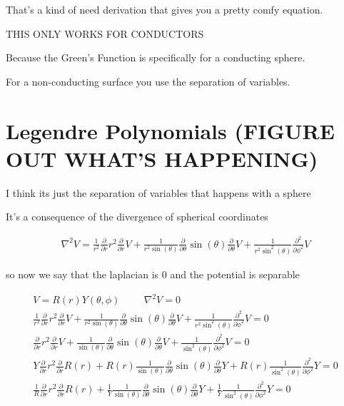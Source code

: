 \documentclass[fleqn]{report}
\newcommand{\hp}{\hspace{1cm}}
\newcommand{\del}{\partial}
\newcommand{\equations} [1] {
\begin{gather*}
#1
\end{gather*}
}
\begin{document}
That's a kind of need derivation that gives you a pretty comfy equation. 

THIS ONLY WORKS FOR CONDUCTORS

Because the Green's Function is specifically for a conducting sphere.

For a non-conducting surface you use the separation of variables. 


\section{Legendre Polynomials (FIGURE OUT WHAT'S HAPPENING)}
I think its just the separation of variables that happens with a sphere 

It's a consequence of the divergence of spherical coordinates 
\equations{
    \nabla^2 V
    =
    \frac{1}{r^2}
    \frac{\del}{\del r} 
    r^2 
    \frac{\del}{\del r}
    V
    +
    \frac{1}{r^2 \sin(\theta)}
    \frac{\del}{\del \theta} 
    \sin(\theta) 
    \frac{\del}{\del \theta} 
    V
    +
    \frac{1}{r^2 \sin^2(\theta)}
    \frac{\del^2}{\del \phi^2} V 
}

so now we say that the laplacian is 0 and the potential is separable 

\equations{
    V = R(r) Y(\theta, \phi)
    \hp
    \nabla^2 V = 0
    \\
    \frac{1}{r^2}
    \frac{\del}{\del r} 
    r^2 
    \frac{\del}{\del r}
    V
    +
    \frac{1}{r^2 \sin(\theta)}
    \frac{\del}{\del \theta} 
    \sin(\theta) 
    \frac{\del}{\del \theta} 
    V
    +
    \frac{1}{r^2 \sin^2(\theta)}
    \frac{\del^2}{\del \phi^2} V 
    =0
    \\
    \frac{\del}{\del r} 
    r^2 
    \frac{\del}{\del r}
    V
    +
    \frac{1}{\sin(\theta)}
    \frac{\del}{\del \theta} 
    \sin(\theta) 
    \frac{\del}{\del \theta} 
    V
    +
    \frac{1}{\sin^2(\theta)}
    \frac{\del^2}{\del \phi^2} V 
    =0
    \\
    Y
    \frac{\del}{\del r} 
    r^2 
    \frac{\del}{\del r}
    R(r) 
    +
    R(r)
    \frac{1}{\sin(\theta)}
    \frac{\del}{\del \theta} 
    \sin(\theta) 
    \frac{\del}{\del \theta} 
    Y
    +
    R(r)
    \frac{1}{\sin^2(\theta)}
    \frac{\del^2}{\del \phi^2}
    Y
    =0
    \\
    \frac{1}{R}
    \frac{\del}{\del r} 
    r^2 
    \frac{\del}{\del r}
    R(r) 
    +
    \frac{1}{Y}
    \frac{1}{\sin(\theta)}
    \frac{\del}{\del \theta} 
    \sin(\theta) 
    \frac{\del}{\del \theta} 
    Y
    +
    \frac{1}{Y}
    \frac{1}{\sin^2(\theta)}
    \frac{\del^2}{\del \phi^2}
    Y
    =0
}
\end{document}
